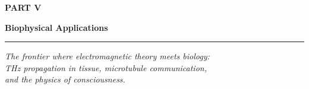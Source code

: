
\cleardoublepage
\thispagestyle{empty}  %

\vspace*{40pt}  %

\begin{center}

{\sffamily\bfseries\fontsize{60}{68}\selectfont PART V}

\vspace{30pt}

{\sffamily\bfseries\fontsize{48}{56}\selectfont Biophysical Applications}

\vspace{20pt}

\rule{0.5\textwidth}{0.4pt}  %

\vspace{20pt}

{\itshape\large
The frontier where electromagnetic theory meets biology:\\
THz propagation in tissue, microtubule communication,\\
and the physics of consciousness.
}

\end{center}

\vspace{80pt}  %

\clearpage
